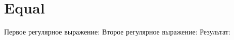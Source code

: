 \section{Equal}
\begin{frame}{}
	Первое регулярное выражение:
	Второе регулярное выражение:
	Результат:
\end{frame}
